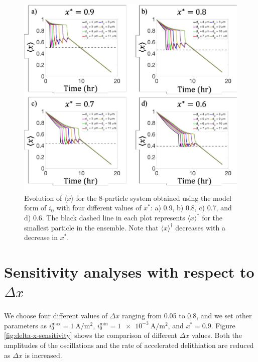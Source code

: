 \documentclass{article}
\begin{document}
\begin{figure}
  \includegraphics[width=\textwidth]{8-particle-evolution-xstar.pdf}
  \caption{Evolution of $\langle x \rangle$ for the 8-particle system obtained using
    the model form of $i_0$ with four different values of $x^\ast$: a)
    0.9, b) 0.8, c) 0.7, and d) 0.6. The black dashed line in each
    plot represents $\langle x \rangle^\dag$ for the smallest particle in the
    ensemble. Note that $\langle x \rangle^\dag$ decreases with a decrease in
    $x^\ast$.}
  \label{fig:x-star-sensitivity}
\end{figure}

\section{Sensitivity analyses with respect to $\Delta x$}

We choose four different values of $\Delta x$ ranging from 0.05 to
0.8, and we set other parameters as
$i_0^{\mathrm{max}}=\SI{1}{\ampere\per\meter\squared}$,
$i_0^{\mathrm{min}}=\SI{1e-3}{\ampere\per\meter\squared}$, and
$x^\ast=0.9$. Figure \ref{fig:delta-x-sensitivity} shows the comparison of different
$\Delta x$ values. Both the amplitudes of the oscillations and the
rate of accelerated delithiation are reduced as $\Delta x$ is
increased.
\end{document}
